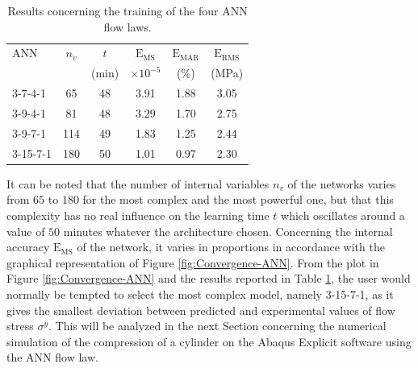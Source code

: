 \documentclass[algorithms,article,submit,pdftex,moreauthors]{Definitions/mdpi}
\DeclareRobustCommand{\MSE}{\text{E}_\text{MS}}
\DeclareRobustCommand{\RMSE}{\text{E}_\text{RMS}}
\DeclareRobustCommand{\MARE}{\text{E}_\text{MAR}}
\begin{document}
\begin{table}[h!]
\centering
\caption{Results concerning the training of the four ANN flow laws.}
\begin{tabular}{lccccc}
	\hline
	ANN      & $n_v$ &  $t$  &      $\MSE$      & $\MARE$ & $\RMSE$ \\
	         &       & (min) & $\times 10^{-5}$ &  (\%)   &  (MPa)  \\ \hline
	3-7-4-1  &  65   &  48   &       3.91       &  1.88   &  3.05   \\
	3-9-4-1  &  81   &  48   &       3.29       &  1.70   &  2.75   \\
	3-9-7-1  &  114  &  49   &       1.83       &  1.25   &  2.44   \\
	3-15-7-1 &  180  &  50   &       1.01       &  0.97   &  2.30   \\ \hline
\end{tabular}
\label{tab:ErrorANN}
\end{table}
It can be noted that the number of internal variables $n_v$ of the networks varies from $65$ to $180$ for the most complex and the most powerful one, but that this complexity has no real influence on the learning time $t$ which oscillates around a value of $50$ minutes whatever the architecture chosen.
Concerning the internal accuracy $\MSE$ of the network, it varies in proportions in accordance with the graphical representation of Figure \ref{fig:Convergence-ANN}.
From the plot in Figure \ref{fig:Convergence-ANN} and the results reported in Table \ref{tab:ErrorANN}, the user would normally be tempted to select the most complex model, namely 3-15-7-1, as it gives the smallest deviation between predicted and experimental values of flow stress $\sigma^y$.
This will be analyzed in the next Section concerning the numerical simulation of the compression of a cylinder on the Abaqus Explicit software using the ANN flow law.
\end{document}
